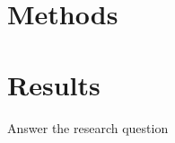 \documentclass[11pt, oneside]{article}
\begin{document}
\section{Methods}


\section{Results}

Answer the research question 




\end{document}
